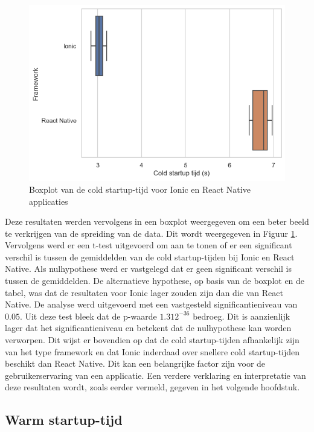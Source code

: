 \begin{figure}
  \centering
  \includegraphics[width=0.7\linewidth]{img/boxplotCold}
  \caption{Boxplot van de cold startup-tijd voor Ionic en React Native applicaties}
  \label{fig:Boxplot van de cold startup-tijd voor Ionic en React Native applicaties}
\end{figure}

Deze resultaten werden vervolgens in een boxplot weergegeven om een beter beeld te verkrijgen van de spreiding van de data. Dit wordt weergegeven in Figuur \ref{fig:Boxplot van de cold startup-tijd voor Ionic en React Native applicaties}. Vervolgens werd er een t-test uitgevoerd om aan te tonen of er een significant verschil is tussen de gemiddelden van de cold startup-tijden bij Ionic en React Native. Als nulhypothese werd er vastgelegd dat er geen significant verschil is tussen de gemiddelden. De alternatieve hypothese, op basis van de boxplot en de tabel, was dat de resultaten voor Ionic lager zouden zijn dan die van React Native. De analyse werd uitgevoerd met een vastgesteld significantieniveau van \(0.05\). Uit deze test bleek dat de p-waarde \(1.312^{-36}\) bedroeg. Dit is aanzienlijk lager dat het significantieniveau en betekent dat de nulhypothese kan worden verworpen. Dit wijst er bovendien op dat de cold startup-tijden afhankelijk zijn van het type framework en dat Ionic inderdaad over snellere cold startup-tijden beschikt dan React Native. Dit kan een belangrijke factor zijn voor de gebruikerservaring van een applicatie. Een verdere verklaring en interpretatie van deze resultaten wordt, zoals eerder vermeld, gegeven in het volgende hoofdstuk.


\subsection{Warm startup-tijd}
\label{subsec:warm-startup-tijd}

